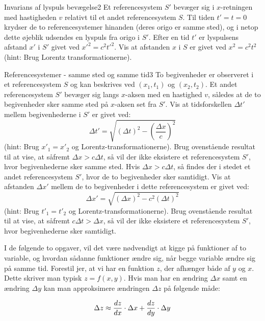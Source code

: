 \begin{opgave}{Invarians af lyspuls bevægelse}{2}
	Et referencesystem $S'$ bevæger sig i $x$-retningen med hastigheden $v$ relativt til et andet referencesystem $S$. Til tiden $t'=t=0$ krydser de to referencesystemer hinanden (deres origo er samme sted), og i netop dette øjeblik udsendes en lyspuls fra origo i $S'$. Efter en tid $t'$ er lyspulsens afstand $x'$ i $S'$ givet ved $x'^2 = c^2 t'^2$. 
	\opg Vis at afstanden $x$ i $S$ er givet ved $x^2 = c^2 t^2$ (hint: Brug Lorentz transformationerne). 
\end{opgave}

\begin{opgave}{Referencesystemer - samme sted og samme tid}{3}
	To begivenheder er observeret i et referencesystem $S$ og kan beskrives ved $\left( x_1 , t_1 \right)$ og $\left( x_2 , t_2 \right)$. Et andet referencesystem $S'$ bevæger sig langs $x$-aksen med en hastighed $v$, således at de to begivenheder sker samme sted på $x$-aksen set fra $S'$.
	\opg Vis at tidsforskellen $\Delta t'$ mellem begivenhederne i $S'$ er givet ved:
	$$\Delta t' = \sqrt{\left( \Delta t \right)^2 - \left( \frac{\Delta x}{c} \right)^2}$$
	(hint: Brug $x'_1 = x'_2$ og Lorentz-transformationerne).
	\opg Brug ovenstående resultat til at vise, at såfremt $\Delta x > c \Delta t$, så vil der ikke eksistere et referencesystem $S'$, hvor begivenhederne sker samme sted.
	\opg Hvis $\Delta x > c \Delta t$, så findes der i stedet et andet referencesystem $S'$, hvor de to begivenheder sker samtidigt. Vis at afstanden $\Delta x'$ mellem de to begivenheder i dette referencesystem er givet ved:
	$$\Delta x' = \sqrt{\left( \Delta x \right)^2 - c^2 \left( \Delta t \right)^2}$$
	(hint: Brug $t'_1 = t'_2$ og Lorentz-transformationerne).
	\opg Brug ovenstående resultat til at vise, at såfremt $c \Delta t > \Delta x$, så vil der ikke eksistere et referencesystem $S'$, hvor begivenhederne sker samtidigt.
\end{opgave}


I de følgende to opgaver, vil det være nødvendigt at kigge på funktioner af to variable, og hvordan sådanne funktioner ændre sig, når begge variable ændre sig på samme tid. 
Forestil jer, at  vi har en funktion $z$, der afhænger både af $y$ og $x$. Dette skriver man typisk $z=f \left( x,y \right)$. Hvis man har en ændring $\Delta x$ samt en ændring $\Delta y$ kan man approksimere ændringen $\Delta z$ på følgende måde:

$$\Delta z \approx {d{z} \over d{x}} \cdot \Delta x + {d{z} \over d{y}} \cdot \Delta y$$


